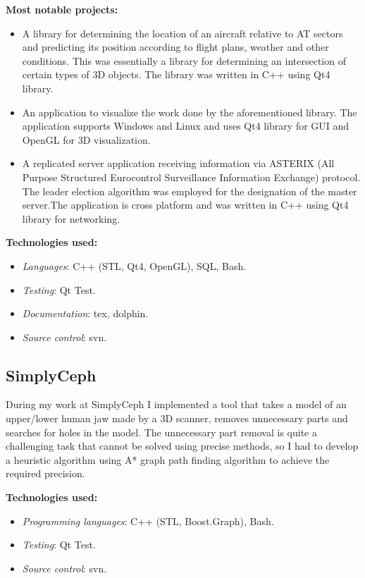 \documentclass[11pt,a4paper]{moderncv}
\begin{document}
  \medskip
  \textbf{Most notable projects:}
  \smallskip
  \begin{itemize}
    \item A library for determining the location of an aircraft relative to AT sectors and predicting its position according to flight plans, weather and other conditions.
      This was essentially a library for determining an intersection of certain types of 3D objects. The library was written in C++ using Qt4 library.
    \item An application to visualize the work done by the aforementioned library. The application supports Windows and Linux and uses Qt4 library for GUI and OpenGL for 3D visualization.
    \item A replicated server application receiving information via ASTERIX (All Purpose Structured Eurocontrol Surveillance Information Exchange) protocol.
      The leader election algorithm was employed for the designation of the master server.The application is cross platform and was written in C++ using Qt4 library for networking.
  \end{itemize}

  \medskip
  \textbf{Technologies used:}
  \smallskip
  \begin{itemize}
    \item \textit{Languages}: C++ (STL, Qt4, OpenGL), SQL, Bash.
    \item \textit{Testing}: Qt Test.
    \item \textit{Documentation}: tex, dolphin.
    \item \textit{Source control}: svn.
  \end{itemize}


\bigskip
\subsection{SimplyCeph}
  During my work at SimplyCeph I implemented a tool that takes a model of an upper/lower human jaw made by a 3D scanner, removes unnecessary parts and searches for holes in the model.
  The unnecessary part removal is quite a challenging task that cannot be solved using precise methods, so I had to develop a heuristic algorithm using A* graph path finding algorithm to achieve the required precision.

  \medskip
  \textbf{Technologies used:}
  \smallskip
  \begin{itemize}
    \item \textit{Programming languages}: C++ (STL, Boost.Graph), Bash.
    \item \textit{Testing}: Qt Test.
    \item \textit{Source control}: svn.
  \end{itemize}
\end{document}
